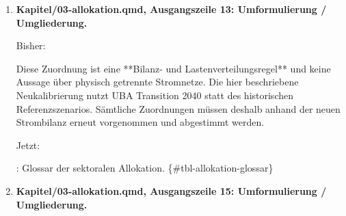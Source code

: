\documentclass[
  ngerman,
  a4paper,
  DIV=11]{scrreprt}
\newenvironment{Shaded}{\begin{snugshade}}{\end{snugshade}}
\newcommand{\NormalTok}[1]{\textcolor[rgb]{0.00,0.23,0.31}{#1}}
\begin{document}
\begin{enumerate}
\begin{Shaded}
\begin{Highlighting}[]
\NormalTok{| Begriff | Bedeutung im Modell |}
\NormalTok{|{-}{-}{-}|{-}{-}{-}|}
\NormalTok{| Zentraler Pool | Für die priorisierten Bedarfe angesetzte Nicht{-}PV{-}Stromerzeugung; „zentral“ bezeichnet die Allokation, nicht Anlagengröße oder Eigentum. |}
\NormalTok{| Budgetfähig | Nach der gewählten Zuordnungsregel für diesen Pool anrechenbar. Der Begriff beschreibt eine Modellentscheidung, keinen Herkunftsnachweis. |}
\NormalTok{| Gebäude{-}PV | Anteil der nationalen PV{-}Erzeugung, der dem Gebäudesektor zugeordnet wird. |}
\NormalTok{| Freiflächen{-}PV | Im Modell die gesamte PV außerhalb von Gebäuden; sie bleibt als eigener nationaler Pool ausgewiesen. |}
\NormalTok{| MIV{-}Anteil | Anteil des MIV am **elektrischen Energiebedarf** des Verkehrs; kein Wege{-} oder Personenkilometeranteil. |}
\NormalTok{| ÖPNV | Öffentlicher Personenverkehr; eigene Teilmenge des elektrischen Verkehrsbedarfs. Übriger Verkehr wird separat geführt. |}
\NormalTok{| MIV{-}Budget / Mobilitätsgutschrift | Dem MIV zugeteilte Deckung aus dem zentralen Pool in PJ Strom/a. Die nutzungsbezogene PE{-}Gutschrift ist in @sec{-}kontext{-}mobilitaet definiert. |}
\NormalTok{| Saldo | Zugeordnete Deckung minus Bedarf; positiv bedeutet Überschuss, negativ Deckungslücke. |}
\end{Highlighting}
\end{Shaded}
\item
  \textbf{Kapitel/03-allokation.qmd, Ausgangszeile 13: Umformulierung /
  Umgliederung.}

  Bisher:

\begin{Shaded}
\begin{Highlighting}[]
\NormalTok{Diese Zuordnung ist eine **Bilanz{-} und Lastenverteilungsregel** und keine Aussage über physisch getrennte Stromnetze. Die hier beschriebene Neukalibrierung nutzt UBA Transition 2040 statt des historischen Referenzszenarios. Sämtliche Zuordnungen müssen deshalb anhand der neuen Strombilanz erneut vorgenommen und abgestimmt werden.}
\end{Highlighting}
\end{Shaded}

  Jetzt:

\begin{Shaded}
\begin{Highlighting}[]
\NormalTok{: Glossar der sektoralen Allokation. \{\#tbl{-}allokation{-}glossar\}}
\end{Highlighting}
\end{Shaded}
\item
  \textbf{Kapitel/03-allokation.qmd, Ausgangszeile 15: Umformulierung /
  Umgliederung.}


\end{enumerate}
\end{document}
